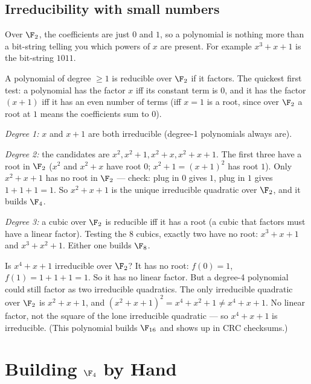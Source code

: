 \subsection{Irreducibility with small numbers}

Over $\F_2$, the coefficients are just $0$ and $1$, so a polynomial is
nothing more than a bit-string telling you which powers of $x$ are present.
For example $x^3 + x + 1$ is the bit-string $1011$.

A polynomial of degree $\geq 1$ is reducible over $\F_2$ if it factors. The
quickest first test: a polynomial has the factor $x$ iff its constant term is
$0$, and it has the factor $(x+1)$ iff it has an even number of terms (iff
$x=1$ is a root, since over $\F_2$ a root at $1$ means the coefficients sum to
$0$).

\begin{example}
\label{ch06:ex-irreducibles}
\emph{Degree 1:} $x$ and $x+1$ are both irreducible (degree-1 polynomials
always are).

\emph{Degree 2:} the candidates are $x^2, x^2+1, x^2+x, x^2+x+1$. The first
three have a root in $\F_2$ ($x^2$ and $x^2+x$ have root $0$; $x^2+1 =
(x+1)^2$ has root $1$). Only $x^2+x+1$ has no root in $\F_2$ --- check:
plug in $0$ gives $1$, plug in $1$ gives $1+1+1=1$. So $x^2+x+1$ is the
unique irreducible quadratic over $\F_2$, and it builds $\F_4$.

\emph{Degree 3:} a cubic over $\F_2$ is reducible iff it has a root (a cubic
that factors must have a linear factor). Testing the $8$ cubics, exactly two
have no root: $x^3+x+1$ and $x^3+x^2+1$. Either one builds $\F_8$.
\end{example}

\begin{walkbox}
Is $x^4 + x + 1$ irreducible over $\F_2$? It has no root: $f(0)=1$,
$f(1)=1+1+1=1$. So it has no linear factor. But a degree-4 polynomial could
still factor as two irreducible quadratics. The only irreducible quadratic
over $\F_2$ is $x^2+x+1$, and $(x^2+x+1)^2 = x^4 + x^2 + 1 \neq x^4+x+1$.
No linear factor, not the square of the lone irreducible quadratic --- so
$x^4+x+1$ is irreducible. (This polynomial builds $\F_{16}$ and shows up in
CRC checksums.)
\end{walkbox}

\section{Building $\F_4$ by Hand}
\label{ch06:build-f4}

